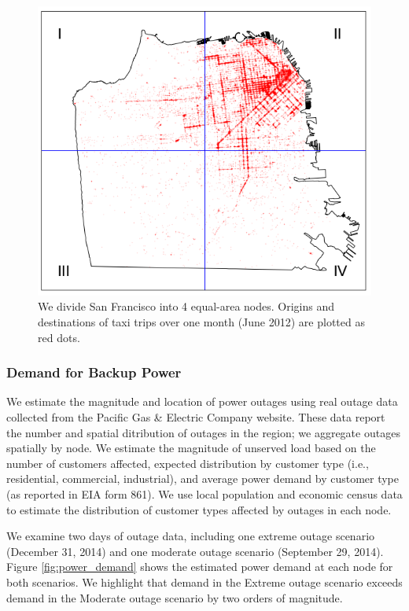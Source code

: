 \documentclass[journal]{IEEEtran}
\begin{document}
\begin{figure}[!htbp]
  \includegraphics[width=\linewidth]{plots/grid1-cropped.png}
  \caption{We divide San Francisco into 4 equal-area nodes. Origins and destinations of taxi trips over one month (June 2012) are plotted as red dots.}
  \label{fig:sf}
\end{figure}

\subsubsection{Demand for Backup Power}
We estimate the magnitude and location of power outages using real outage data collected from the Pacific Gas \& Electric Company website. These data report the number and spatial ditribution of outages in the region; we aggregate outages spatially by node. We estimate the magnitude of unserved load based on the number of customers affected, expected distribution by customer type (i.e., residential, commercial, industrial), and average power demand by customer type (as reported in EIA form 861). We use local population and economic census data to estimate the distribution of customer types affected by outages in each node.

We examine two days of outage data, including one extreme outage scenario (December 31, 2014) and one moderate outage scenario (September 29, 2014). Figure \ref{fig:power_demand} shows the estimated power demand at each node for both scenarios. We highlight that demand in the Extreme outage scenario exceeds demand in the Moderate outage scenario by two orders of magnitude.
\end{document}

